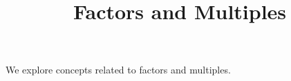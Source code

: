 \documentclass{ximera}
\title{Factors and Multiples}
\begin{document}
\begin{abstract}
\end{abstract}
\maketitle

We explore concepts related to factors and multiples.
\end{document}

